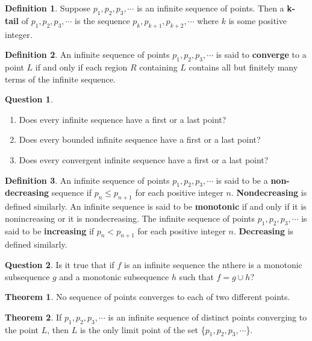 \documentclass{article}
\theoremstyle{definition}
\newtheorem{definition}{Definition}
\newtheorem{question}{Question}
\newtheorem{theorem}{Theorem}
\theoremstyle{definition}
\theoremstyle{plain}
\begin{document}
\begin{definition}
  Suppose $p_1, p_2, p_3, \cdots$ is an infinite sequence of points. Then a
  \textbf{k-tail} of $p_1, p_2, p_3, \cdots$ is the sequence $p_k, p_{k+1},
  p_{k+2}, \cdots$ where $k$ is some positive integer.
\end{definition}

\begin{definition}
  An infinite sequence of points $p_1, p_2, p_3, \cdots$ is said to
  \textbf{converge} to a point $L$ if and only if each region $R$ containing
  $L$ contains all but finitely many terms of the infinite sequence.
\end{definition}

\begin{question}
  \begin{enumerate}
    \item Does every infinite sequence have a first or a last point?
    \item Does every bounded infinite sequence have a first or a last point?
    \item Does every convergent infinite sequence have a first or a last point?
  \end{enumerate}
\end{question}

\begin{definition}
  An infinite sequence of points $p_1, p_2, p_3, \cdots$ is said to be a
  \textbf{non-decreasing} sequence if $p_n \leq p_{n+1}$ for each positive
  integer $n$.  \textbf{Nondecreasing} is defined similarly.  An infinite
  sequence is said to be \textbf{monotonic} if and only if it is nonincreasing
  or it is nondecreasing.  The infinite sequence of points $p_1, p_2, p_3,
  \cdots$ is said to be \textbf{increasing} if $p_n < p_{n+1}$ for each
  positive integer $n$.  \textbf{Decreasing} is defined similarly.
\end{definition}

\begin{question}
  Is it true that if $f$ is an infinite sequence the nthere is a monotonic
  subsequence $g$ and a monotonic subsequence $h$ such that $f = g \cup h$?
\end{question}

\begin{theorem}
  No sequence of points converges to each of two different points.
\end{theorem}

\begin{theorem}
  If $p_1, p_2, p_3, \cdots$ is an infinite sequence of distinct points
  converging to the point $L$, then $L$ is the only limit point of the set
  \{$p_1, p_2, p_3, \cdots$\}.
\end{theorem}
\end{document}
